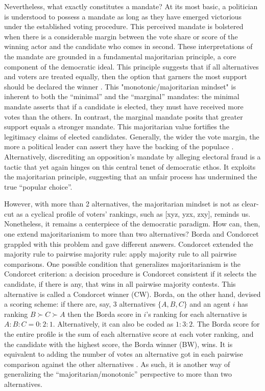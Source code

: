 \documentclass[hidelinks,11pt]{article} \usepackage[utf8]{inputenc}
\begin{document}
Nevertheless, what exactly constitutes a mandate? At its most basic, a politician is understood to possess a mandate as long as they have emerged victorious under the established voting procedure. This perceived mandate is bolstered when there is a considerable margin between the vote share or score of the winning actor and the candidate who comes in second. These interpretations of the mandate are grounded in a fundamental majoritarian principle, a core component of the democratic ideal. This principle suggests that if all alternatives and voters are treated equally, then the option that garners the most support should be declared the winner \parencite{dahl1989democracy}. This "monotonic/majoritarian mindset" is inherent to both the ``minimal'' and the ``marginal'' mandates: the minimal mandate asserts that if a candidate is elected, they must have received more votes than the others. In contrast, the marginal mandate posits that greater support equals a stronger mandate. This majoritarian value fortifies the legitimacy claims of elected candidates. Generally, the wider the vote margin, the more a political leader can assert they have the backing of the populace \parencite{grossman2022majoritarian}. Alternatively, discrediting an opposition's mandate by alleging electoral fraud is a tactic that yet again hinges on this central tenet of democratic ethos. It exploits the majoritarian principle, suggesting that an unfair process has undermined the true ``popular choice''.

However, with more than 2 alternatives, the majoritarian mindset is not as clear-cut as a cyclical profile of voters' rankings, such as [xyz, yzx, zxy], reminds us. Nonetheless, it remains a centerpiece of the democratic paradigm. How can, then, one extend majoritarianism to more than two alternatives? Borda and Condorcet grappled with this problem and gave different answers. Condorcet extended the majority rule to pairwise majority rule: apply majority rule to all pairwise comparisons. One possible condition that generalizes majoritarianism is the Condorcet criterion: a decision procedure is Condorcet consistent if it selects the candidate, if there is any, that wins in all pairwise majority contests. This alternative is called a Condorcet winner (CW). Borda, on the other hand, devised a scoring scheme: if there are, say, 3 alternatives \(\{A,B,C\}\) and an agent \(i\) has ranking \(B\succ C\succ A\) then the Borda score in \(i\)'s ranking for each alternative is \(A:B:C = 0:2:1\). Alternatively, it can also be coded as \(1:3:2\). The Borda score for the entire profile is the sum of each alternative score at each voter ranking, and the candidate with the highest score, the Borda winner (BW), wins. It is equivalent to adding the number of votes an alternative got in each pairwise comparison against the other alternatives \parencite{nurmi1999voting}. As such, it is another way of generalizing the ``majoritarian/monotonic'' perspective to more than two alternatives.
\end{document}
